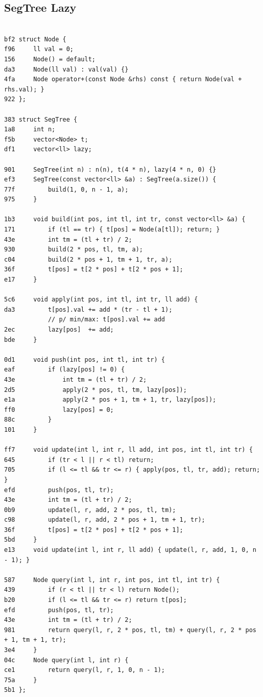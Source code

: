 \documentclass[11pt, a4paper, twoside]{article}
\begin{document}
\subsection{SegTree Lazy}
\begin{lstlisting}

bf2 struct Node {
f96     ll val = 0;
156     Node() = default;
da3     Node(ll val) : val(val) {}
4fa     Node operator+(const Node &rhs) const { return Node(val + rhs.val); }
922 };

383 struct SegTree {
1a8     int n;
f5b     vector<Node> t;
df1     vector<ll> lazy;
    
901     SegTree(int n) : n(n), t(4 * n), lazy(4 * n, 0) {}
ef3     SegTree(const vector<ll> &a) : SegTree(a.size()) {
77f         build(1, 0, n - 1, a);
975     }
    
1b3     void build(int pos, int tl, int tr, const vector<ll> &a) {
171         if (tl == tr) { t[pos] = Node(a[tl]); return; }
43e         int tm = (tl + tr) / 2;
930         build(2 * pos, tl, tm, a);
c04         build(2 * pos + 1, tm + 1, tr, a);
36f         t[pos] = t[2 * pos] + t[2 * pos + 1];
e17     }
    
5c6     void apply(int pos, int tl, int tr, ll add) {
da3         t[pos].val += add * (tr - tl + 1);
            // p/ min/max: t[pos].val += add
2ec         lazy[pos]  += add;
bde     }
    
0d1     void push(int pos, int tl, int tr) {
eaf         if (lazy[pos] != 0) {
43e             int tm = (tl + tr) / 2;
2d5             apply(2 * pos, tl, tm, lazy[pos]);
e1a             apply(2 * pos + 1, tm + 1, tr, lazy[pos]);
ff0             lazy[pos] = 0;
88c         }
101     }
    
ff7     void update(int l, int r, ll add, int pos, int tl, int tr) {
645         if (tr < l || r < tl) return;
705         if (l <= tl && tr <= r) { apply(pos, tl, tr, add); return; }
efd         push(pos, tl, tr);
43e         int tm = (tl + tr) / 2;
0b9         update(l, r, add, 2 * pos, tl, tm);
c98         update(l, r, add, 2 * pos + 1, tm + 1, tr);
36f         t[pos] = t[2 * pos] + t[2 * pos + 1];
5bd     }
e13     void update(int l, int r, ll add) { update(l, r, add, 1, 0, n - 1); }
    
587     Node query(int l, int r, int pos, int tl, int tr) {
439         if (r < tl || tr < l) return Node();
b20         if (l <= tl && tr <= r) return t[pos];
efd         push(pos, tl, tr);
43e         int tm = (tl + tr) / 2;
981         return query(l, r, 2 * pos, tl, tm) + query(l, r, 2 * pos + 1, tm + 1, tr);
3e4     }
04c     Node query(int l, int r) {
ce1         return query(l, r, 1, 0, n - 1);
75a     }
5b1 };
\end{lstlisting}
\end{document}

